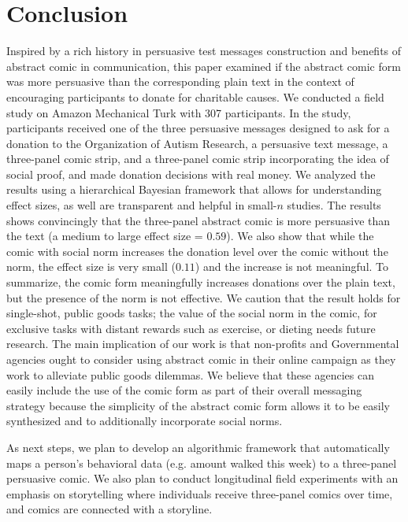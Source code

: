 \section{Conclusion}
\label{sec:Conclusion}

Inspired by a rich history in persuasive test messages construction and benefits of abstract comic in communication, this paper examined if the abstract comic form was more persuasive than the corresponding plain text in the context of encouraging participants to donate for charitable causes. We conducted a field study on Amazon Mechanical Turk with 307 participants. In the study, participants received one of the three persuasive messages designed to ask for a donation to the Organization of Autism Research, a persuasive text message, a three-panel comic strip, and a three-panel comic strip incorporating the idea of social proof, and made donation decisions with real money. We analyzed the results using a hierarchical Bayesian framework that allows for understanding effect sizes, as well are transparent and helpful in small-$n$ studies. The results shows convincingly that the three-panel abstract comic is more persuasive than the text (a medium to large effect size = $0.59$). We also show that while the comic with social norm increases the donation level over the comic without the norm, the effect size is very small ($0.11$) and the increase is not meaningful. To summarize, the comic form meaningfully increases donations over the plain text, but the presence of the norm is not effective. We caution that the result holds for single-shot, public goods tasks; the value of the social norm in the comic, for exclusive tasks with distant rewards such as exercise, or dieting needs future research. The main implication of our work is that non-profits and Governmental agencies ought to consider using abstract comic in their online campaign as they work to alleviate public goods dilemmas. We believe that these agencies can easily include the use of the comic form as part of their overall messaging strategy because the simplicity of the abstract comic form allows it to be easily synthesized and to additionally incorporate social norms. 

As next steps, we plan to develop an algorithmic framework that automatically maps a person's behavioral data (e.g. amount walked this week) to a three-panel persuasive comic. We also plan to conduct longitudinal field experiments with an emphasis on storytelling where individuals receive three-panel comics over time, and comics are connected with a storyline.

